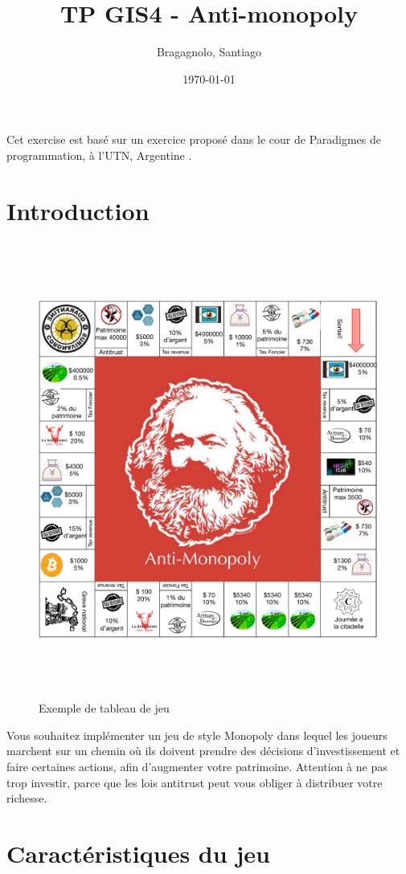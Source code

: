 \documentclass[12pt]{article}
\author{
        Bragagnolo, Santiago
}
\title{TP GIS4 - Anti-monopoly}
\date{\today}
\begin{document}
\maketitle
Cet exercise est basé sur un exercice proposé dans le cour de Paradigmes de programmation, à l'UTN, Argentine .

\section{Introduction}

\begin{figure}
\includegraphics[width=15cm,height=15cm,keepaspectratio]{figures/board.pdf}
\caption{Exemple de tableau de jeu}
\end{figure}




Vous souhaitez implémenter un jeu de style Monopoly dans lequel les joueurs marchent sur un chemin où
ils doivent prendre des décisions d'investissement et faire certaines actions, afin d'augmenter votre
patrimoine. Attention à ne pas trop investir, parce que les lois antitrust peut vous obliger à
distribuer votre richesse.


\section{Caractéristiques du jeu}
\end{document}
